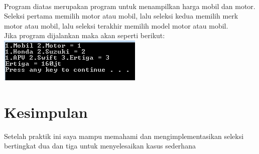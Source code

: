 \documentclass[a4paper,12pt]{article}
\begin{document}
    \paragraph{}
    Program diatas merupakan program untuk menampilkan harga mobil dan motor. Seleksi pertama memilih motor atau mobil, lalu seleksi kedua memilih merk motor atau mobil, lalu seleksi terakhir memilih model motor atau mobil.\\
    Jika program dijalankan maka akan seperti berikut:\\
    \includegraphics{Latihan3.PNG}

    \newpage
    \section{Kesimpulan}
Setelah praktik ini saya mampu memahami dan mengimplementasikan seleksi bertingkat dua dan tiga untuk
menyelesaikan kasus sederhana
\end{document}
